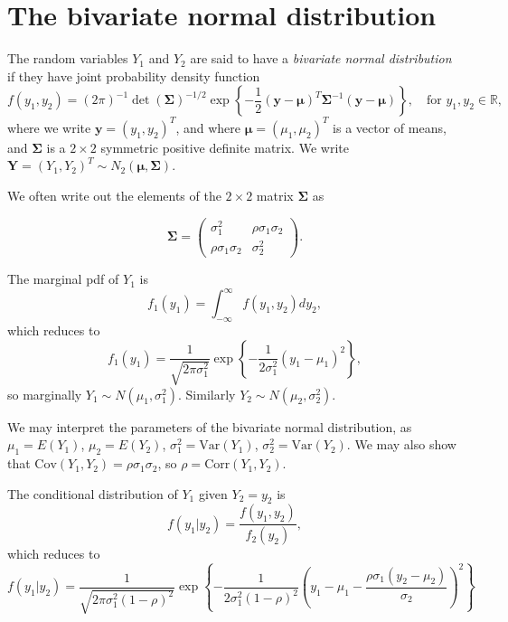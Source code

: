 \documentclass[]{book}
\theoremstyle{definition}
\theoremstyle{definition}
\theoremstyle{definition}
\theoremstyle{remark}
\let\BeginKnitrBlock\begin \let\EndKnitrBlock\end
\begin{document}
\section{The bivariate normal
distribution}\label{the-bivariate-normal-distribution}

\BeginKnitrBlock{definition}
\protect\hypertarget{def:unnamed-chunk-69}{}{\label{def:unnamed-chunk-69}
}The random variables \(Y_1\) and \(Y_2\) are said to have a
\emph{bivariate normal distribution} if they have joint probability
density function
\[f(y_1, y_2) = (2 \pi)^{-1} {\det(\bm \Sigma)}^{-1/2} \exp\left\{ - \frac{1}{2}(\bm y - \bm \mu)^T \bm \Sigma^{-1}(\bm y - \bm \mu)\right\},
\quad \text{for $y_1, y_2 \in \mathbb{R}$},\] where we write
\(\bm y = (y_1, y_2)^T\), and where \(\bm \mu = (\mu_1, \mu_2)^T\) is a
vector of means, and \(\bm \Sigma\) is a \(2 \times 2\) symmetric
positive definite matrix. We write
\(\bm Y = (Y_1, Y_2)^T \sim N_2(\bm \mu, \bm \Sigma)\).
\EndKnitrBlock{definition}

We often write out the elements of the \(2 \times 2\) matrix
\(\bm \Sigma\) as

\begin{equation}
\bm \Sigma = \begin{pmatrix}
  \sigma_1^2 & \rho \sigma_1 \sigma_2 \\
  \rho \sigma_1 \sigma_2 & \sigma_2^2
  \end{pmatrix}.
\label{eq:sigma}
\end{equation}

The marginal pdf of \(Y_1\) is
\[f_1(y_1) = \int_{-\infty}^\infty f(y_1, y_2) dy_2,\] which reduces to
\[f_1(y_1) = \frac{1}{\sqrt{2 \pi \sigma_1^2}} \exp\left\{- \frac{1}{2 \sigma_1^2} (y_1 - \mu_1)^2\right\},\]
so marginally \(Y_1 \sim N(\mu_1, \sigma_1^2)\). Similarly
\(Y_2 \sim N(\mu_2, \sigma_2^2)\).

We may interpret the parameters of the bivariate normal distribution, as
\(\mu_1 = E(Y_1)\), \(\mu_2 = E(Y_2)\),
\(\sigma_1^2 = \text{Var}(Y_1)\), \(\sigma_2^2 = \text{Var}(Y_2)\). We
may also show that \(\text{Cov}(Y_1, Y_2) = \rho \sigma_1 \sigma_2\), so
\(\rho = \text{Corr}(Y_1, Y_2)\).

The conditional distribution of \(Y_1\) given \(Y_2 = y_2\) is
\[f(y_1 | y_2) = \frac{f(y_1, y_2)}{f_2(y_2)},\] which reduces to
\[f(y_1 | y_2) =  \frac{1}{\sqrt{2 \pi \sigma_1^2 (1 - \rho)^2}}
\exp\left\{ - \frac{1}{2 \sigma_1^2 (1 - \rho)^2} 
\left(y_1 - \mu_1 - 
\frac{\rho \sigma_1(y_2 - \mu_2)}{\sigma_2}\right)^2\right\}\]
\end{document}
